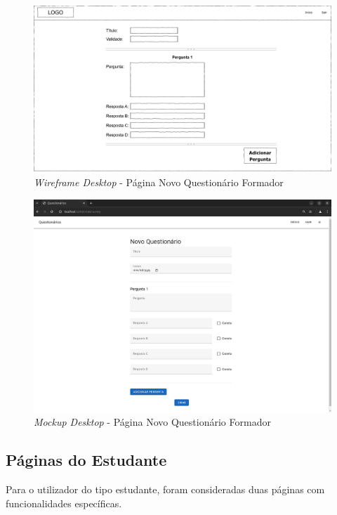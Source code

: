 \documentclass[12pt,a4paper,final]{article}
\begin{document}
    \begin{figure}[H]
        \centering
        \includegraphics[width=\textwidth,height=0.9\textheight,keepaspectratio]{wireframes/questionarios.wireframes-formador-novo-questionario-desktop.drawio}
        \caption{\textit{Wireframe Desktop} - Página Novo Questionário Formador}
        \label{fig:wd-pnqf}
    \end{figure}

    \begin{figure}[H]
        \centering
        \includegraphics[width=\textwidth,height=0.9\textheight,keepaspectratio]{mockups/questionarios.wireframes-formador-novo-questionario-desktop}
        \caption{\textit{Mockup Desktop} - Página Novo Questionário Formador}
        \label{fig:md-pnqf}
    \end{figure}

    \subsection{Páginas do Estudante}\label{subsec:paginas-do-estudante}
    Para o utilizador do tipo estudante, foram consideradas duas páginas com funcionalidades específicas.
\end{document}
